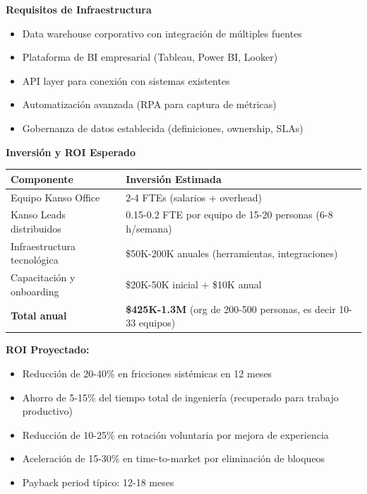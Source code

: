 \textbf{Requisitos de Infraestructura}

\begin{itemize}
    \item Data warehouse corporativo con integración de múltiples fuentes
    \item Plataforma de BI empresarial (Tableau, Power BI, Looker)
    \item API layer para conexión con sistemas existentes
    \item Automatización avanzada (RPA para captura de métricas)
    \item Gobernanza de datos establecida (definiciones, ownership, SLAs)
\end{itemize}

\textbf{Inversión y ROI Esperado}

\begin{center}
\small
\begin{tabular}{|p{5cm}|p{8cm}|}
\hline
\textbf{Componente} & \textbf{Inversión Estimada} \\ \hline
Equipo Kanso Office & 2-4 FTEs (salarios + overhead) \\ \hline
Kanso Leads distribuidos & 0.15-0.2 FTE por equipo de 15-20 personas (6-8 h/semana) \\ \hline
Infraestructura tecnológica & \$50K-200K anuales (herramientas, integraciones) \\ \hline
Capacitación y onboarding & \$20K-50K inicial + \$10K anual \\ \hline
\textbf{Total anual} & \textbf{\$425K-1.3M} (org de 200-500 personas, es decir 10-33 equipos) \\ \hline
\end{tabular}
\end{center}

\textbf{ROI Proyectado:}
\begin{itemize}
    \item Reducción de 20-40\% en fricciones sistémicas en 12 meses
    \item Ahorro de 5-15\% del tiempo total de ingeniería (recuperado para trabajo productivo)
    \item Reducción de 10-25\% en rotación voluntaria por mejora de experiencia
    \item Aceleración de 15-30\% en time-to-market por eliminación de bloqueos
    \item Payback period típico: 12-18 meses
\end{itemize}

